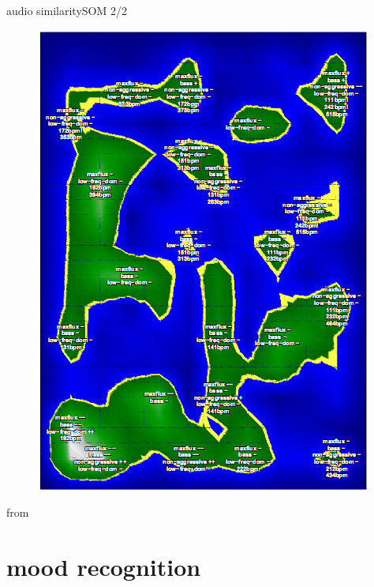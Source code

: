         \begin{frame}{audio similarity}{SOM 2/2}
                    \begin{figure}
                        \centering
                            \includegraphics[scale=.3]{graph/som}
                    \end{figure}
                    from 
        \end{frame}


    \section[mood]{mood recognition}

